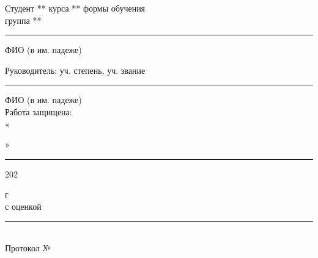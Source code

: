 		\vspace{2.5em}
		
   \hspace{-5em} 


\noindent
\begin{minipage}[t]{0.5\textwidth}
  \begin{flushleft}
  \linespread{1}

		
		
		\end{flushleft}
\end{minipage}%
\begin{minipage}[t]{0.5\textwidth}
  \begin{flushleft}
  \linespread{1}
	\small{
    Студент ** курса
	** формы обучения \\
  группа **\\
        \rule{1,8cm}{0,1pt} ФИО (в им. падеже)\\
	\vspace{2em}
		
	Руководитель: уч. степень, уч. звание\\
            \rule{1,8cm}{0,1pt} ФИО (в им. падеже)\\
\vspace{2em}
 Работа защищена:\\
        «\rule{0,9cm}{0,1pt}»\rule{2,7cm}{0,1pt} 202\,\rule{0,2cm}{0,1pt} г \\
с оценкой \rule{1,8cm}{0,1pt}\\
Протокол № \rule{0,9cm}{0,1pt}}
		
		
		\end{flushleft}
\end{minipage}

    \vfill
    
\newpage